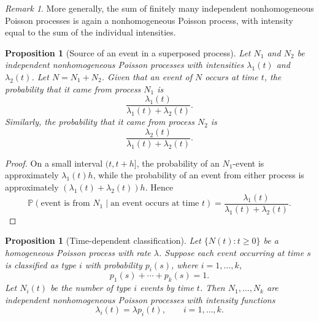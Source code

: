 \documentclass[11pt]{article}
\theoremstyle{plain}
\newtheorem{proposition}[theorem]{Proposition}
\theoremstyle{definition}
\theoremstyle{remark}
\newtheorem{remark}[theorem]{Remark}
\begin{document}
	
	\begin{remark}
		More generally, the sum of finitely many independent nonhomogeneous Poisson processes is again a nonhomogeneous Poisson process, with intensity equal to the sum of the individual intensities.
	\end{remark}
	
	\begin{proposition}[Source of an event in a superposed process]
		Let \(N_1\) and \(N_2\) be independent nonhomogeneous Poisson processes with intensities \(\lambda_1(t)\) and \(\lambda_2(t)\). Let \(N=N_1+N_2\). Given that an event of \(N\) occurs at time \(t\), the probability that it came from process \(N_1\) is
		\[
		\frac{\lambda_1(t)}{\lambda_1(t)+\lambda_2(t)}.
		\]
		Similarly, the probability that it came from process \(N_2\) is
		\[
		\frac{\lambda_2(t)}{\lambda_1(t)+\lambda_2(t)}.
		\]
	\end{proposition}
	
	\begin{proof}
		On a small interval \((t,t+h]\), the probability of an \(N_1\)-event is approximately \(\lambda_1(t)h\), while the probability of an event from either process is approximately \((\lambda_1(t)+\lambda_2(t))h\). Hence
		\[
		\mathbb{P}(\text{event is from }N_1\mid \text{an event occurs at time }t)
		=
		\frac{\lambda_1(t)}{\lambda_1(t)+\lambda_2(t)}.
		\]
	\end{proof}
	
\begin{proposition}[Time-dependent classification]
	Let \(\{N(t):t\ge 0\}\) be a homogeneous Poisson process with rate
	\(\lambda\). Suppose each event occurring at time \(s\) is classified
	as type \(i\) with probability \(p_i(s)\), where \(i=1,\dots,k\),
	\[
	p_1(s)+\cdots+p_k(s)=1.
	\]
	Let \(N_i(t)\) be the number of type \(i\) events by time \(t\).
	Then \(N_1,\dots,N_k\) are independent nonhomogeneous Poisson
	processes with intensity functions
	\[
	\lambda_i(t)=\lambda p_i(t),
	\qquad i=1,\dots,k.
	\]
\end{proposition}
\end{document}
